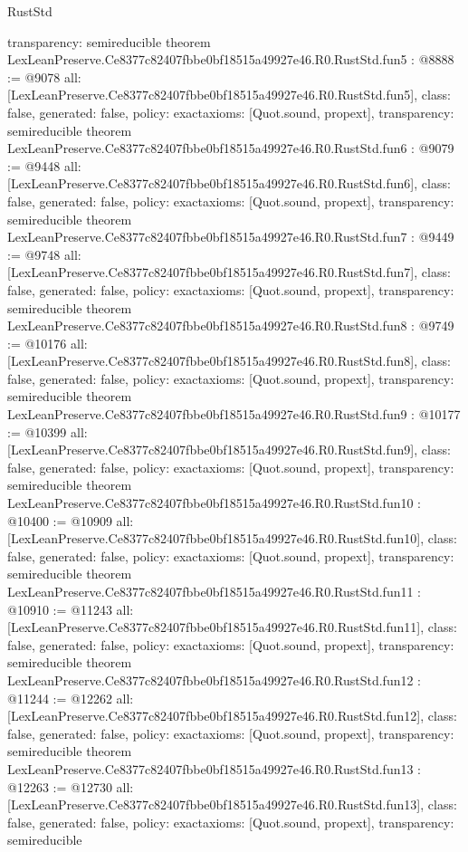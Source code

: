 \begin{lexlean}{RustStd}
\begin{coremodule}
{  transparency: semireducible
}
theorem LexLeanPreserve.Ce8377c82407fbbe0bf18515a49927e46.R0.RustStd.fun5 : @8888 := @9078 {
  all: [LexLeanPreserve.Ce8377c82407fbbe0bf18515a49927e46.R0.RustStd.fun5],
  class: false,
  generated: false,
  policy: exact{axioms: [Quot.sound, propext]},
  transparency: semireducible
}
theorem LexLeanPreserve.Ce8377c82407fbbe0bf18515a49927e46.R0.RustStd.fun6 : @9079 := @9448 {
  all: [LexLeanPreserve.Ce8377c82407fbbe0bf18515a49927e46.R0.RustStd.fun6],
  class: false,
  generated: false,
  policy: exact{axioms: [Quot.sound, propext]},
  transparency: semireducible
}
theorem LexLeanPreserve.Ce8377c82407fbbe0bf18515a49927e46.R0.RustStd.fun7 : @9449 := @9748 {
  all: [LexLeanPreserve.Ce8377c82407fbbe0bf18515a49927e46.R0.RustStd.fun7],
  class: false,
  generated: false,
  policy: exact{axioms: [Quot.sound, propext]},
  transparency: semireducible
}
theorem LexLeanPreserve.Ce8377c82407fbbe0bf18515a49927e46.R0.RustStd.fun8 : @9749 := @10176 {
  all: [LexLeanPreserve.Ce8377c82407fbbe0bf18515a49927e46.R0.RustStd.fun8],
  class: false,
  generated: false,
  policy: exact{axioms: [Quot.sound, propext]},
  transparency: semireducible
}
theorem LexLeanPreserve.Ce8377c82407fbbe0bf18515a49927e46.R0.RustStd.fun9 : @10177 := @10399 {
  all: [LexLeanPreserve.Ce8377c82407fbbe0bf18515a49927e46.R0.RustStd.fun9],
  class: false,
  generated: false,
  policy: exact{axioms: [Quot.sound, propext]},
  transparency: semireducible
}
theorem LexLeanPreserve.Ce8377c82407fbbe0bf18515a49927e46.R0.RustStd.fun10 : @10400 := @10909 {
  all: [LexLeanPreserve.Ce8377c82407fbbe0bf18515a49927e46.R0.RustStd.fun10],
  class: false,
  generated: false,
  policy: exact{axioms: [Quot.sound, propext]},
  transparency: semireducible
}
theorem LexLeanPreserve.Ce8377c82407fbbe0bf18515a49927e46.R0.RustStd.fun11 : @10910 := @11243 {
  all: [LexLeanPreserve.Ce8377c82407fbbe0bf18515a49927e46.R0.RustStd.fun11],
  class: false,
  generated: false,
  policy: exact{axioms: [Quot.sound, propext]},
  transparency: semireducible
}
theorem LexLeanPreserve.Ce8377c82407fbbe0bf18515a49927e46.R0.RustStd.fun12 : @11244 := @12262 {
  all: [LexLeanPreserve.Ce8377c82407fbbe0bf18515a49927e46.R0.RustStd.fun12],
  class: false,
  generated: false,
  policy: exact{axioms: [Quot.sound, propext]},
  transparency: semireducible
}
theorem LexLeanPreserve.Ce8377c82407fbbe0bf18515a49927e46.R0.RustStd.fun13 : @12263 := @12730 {
  all: [LexLeanPreserve.Ce8377c82407fbbe0bf18515a49927e46.R0.RustStd.fun13],
  class: false,
  generated: false,
  policy: exact{axioms: [Quot.sound, propext]},
  transparency: semireducible
}
\end{coremodule}
\end{lexlean}
